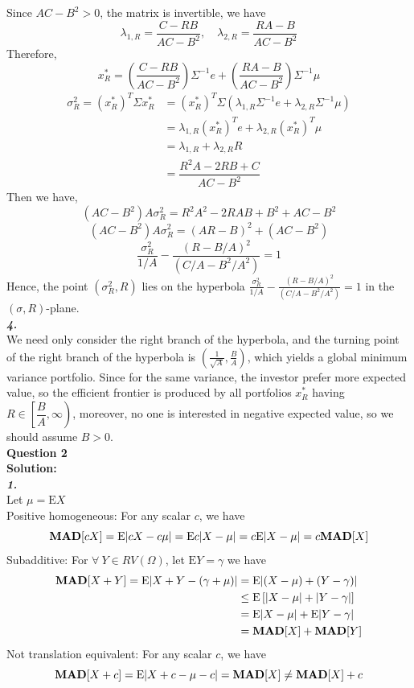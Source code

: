 \documentclass[11pt,a4paper]{article}
\begin{document}
Since $AC-B^{2}>0$, the matrix is invertible, we have 
$$
\lambda_{1, R}=\frac{C-R B}{A C-B^{2}}, \quad \lambda_{2, R}=\frac{R A-B}{A C-B^{2}}
$$
Therefore,
$$
x^{*}_{R}=\left(\frac{C-R B}{A C-B^{2}}\right) \Sigma^{-1} e+\left(\frac{R A-B}{A C-B^{2}}\right) \Sigma^{-1} \mu
$$
$$\begin{aligned}
\sigma_{R}^{2}=(x_{R}^{*})^{T} \Sigma x_{R}^{*}&=(x_{R}^{*})^{T}\Sigma(\lambda_{1, R}\Sigma^{-1}e+ \lambda_{2, R}\Sigma^{-1}  \mu)\\
&=\lambda_{1, R}(x_{R}^{*})^{T}e+\lambda_{2, R}(x_{R}^{*})^{T}\mu\\
&=\lambda_{1, R} + \lambda_{2, R}R\\
&=\dfrac{R^{2}A-2RB+C}{AC-B^{2}}
\end{aligned}$$
Then we have,
$$(AC-B^{2})A\sigma_{R}^{2}=R^{2}A^{2}-2RAB+B^{2}+AC-B^{2}$$
$$(AC-B^{2})A\sigma_{R}^{2}=(AR-B)^{2}+(AC-B^{2})$$
$$
\frac{\sigma_{R}^{2}}{1 / A}-\frac{(R-B / A)^{2}}{\left(C / A-B^{2} / A^{2}\right)}=1
$$
Hence, the point $(\sigma^{2}_{R},R)$ lies on the hyperbola $
\frac{\sigma_{R}^{2}}{1 / A}-\frac{(R-B / A)^{2}}{\left(C / A-B^{2} / A^{2}\right)}=1
$ in the $(\sigma,R)$-plane.\\


\textit{\textbf{4.}}\\
We need only consider the right branch of the hyperbola, and the turning point of the right branch of the hyperbola is $\left(\frac{1}{\sqrt{A}}, \frac{B}{A}\right)$, which yields a global minimum variance portfolio. Since for the same variance, the investor prefer more expected value, so the efficient frontier is produced by all portfolios $x^{*}_{R}$ having $R\in \left[\dfrac{B}{A},\infty\right)$, moreover, no one is interested in negative expected value, so we should assume $B>0$.\\


\textbf{Question 2}\\
\textbf{Solution:}\\
\textit{\textbf{1.}}\\
Let $\mu=\mathrm{E}X$\\
Positive homogeneous: For any scalar $c$, we have\\ $$\text{\textbf{MAD}}
[cX]=\mathrm{E}|cX-c\mu|=\mathrm{E}c|X-\mu|=c\mathrm{E}|X-\mu|=c\text{\textbf{MAD}}[X]$$
Subadditive: For $\forall \ Y\in RV(\Omega)$, let $\mathrm{E}Y=\gamma$ we have\\
$$\begin{aligned}\text{\textbf{MAD}}[X+Y]=\mathrm{E}|X+Y-(\gamma+\mu)|&=\mathrm{E}|(X-\mu)+(Y-\gamma)|\\
&\leq \mathrm{E}\left[|X-\mu| + |Y-\gamma|  \right]\\
&=\mathrm{E}|X-\mu|+\mathrm{E}|Y-\gamma|\\
&=\text{\textbf{MAD}}[X]+\text{\textbf{MAD}}[Y]
\end{aligned}$$
Not translation equivalent: For any scalar $c$, we have 
$$\text{\textbf{MAD}}[X+c]=\mathrm{E}|X+c-\mu-c|=\text{\textbf{MAD}}[X]\neq\text{\textbf{MAD}}[X]+c$$\\
\end{document}
